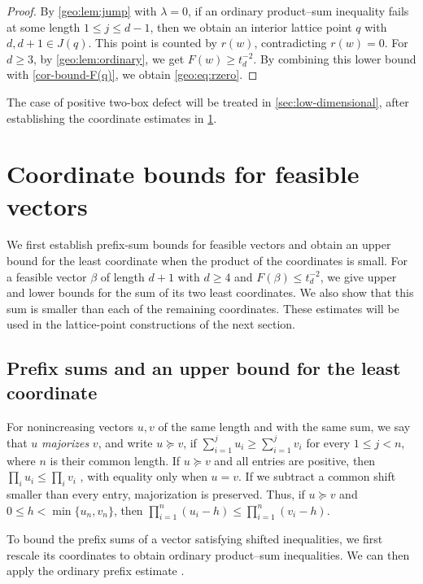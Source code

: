 \documentclass[reqno, 11pt]{article}
\numberwithin{equation}{section}
\theoremstyle{definition}
\begin{document}
\begin{proof}
By \cref{geo:lem:jump} with $\lambda=0$, if an ordinary product--sum inequality fails at some length
$1\le j\le d-1$, then we obtain an interior lattice point $q$ with $d,d+1\in J(q)$.
This point is counted by $r(w)$, contradicting $r(w)=0$.
For $d\ge3$, by \cref{geo:lem:ordinary}, we get $F(w)\ge t_d^{-2}$.
By combining this lower bound with \cref{cor-bound-F(q)}, we obtain \eqref{geo:eq:rzero}.
\end{proof}


The case of positive two-box defect will be treated in \cref{sec:low-dimensional},
after establishing the coordinate estimates in \cref{ra:sec:analysis}.





\section{Coordinate bounds for feasible vectors}
\label{ra:sec:analysis}

We first establish prefix-sum bounds for feasible vectors and obtain an
upper bound for the least coordinate when the product of the coordinates
is small. For a feasible vector \(\beta\) of length \(d+1\) 
with $d\ge4$ and $F(\beta)\le t_d^{-2}$, we give upper and lower bounds for the sum of its two least coordinates. 
We also show that this sum is smaller than each of the remaining coordinates. These estimates
will be used in the lattice-point constructions of the next section.

\subsection{Prefix sums and an upper bound for the least coordinate}

For nonincreasing vectors \(u, v\) of the same length and with the same sum, we say that \(u\) \emph{majorizes} \(v\), and write \(u \succeq v\), if \(\sum_{i=1}^j u_i \ge \sum_{i=1}^j v_i\) for every \(1 \le j < n\), where \(n\) is their common length. If \(u \succeq v\) and all entries are positive, then \(\prod_i u_i \le \prod_i v_i\) \cite[Chapter~3]{MOA2011}, with equality only when \(u = v\).
If we subtract a common shift smaller than every entry, majorization is preserved. 
Thus, if $u\succeq v$ and $0\le h<\min\{u_n,v_n\}$, then $\prod_{i=1}^n(u_i-h) \le\prod_{i=1}^n(v_i-h)$.



To bound the prefix sums of a vector satisfying shifted inequalities,
we first rescale its coordinates to obtain ordinary product--sum
inequalities. We can then apply the ordinary prefix estimate
\cite[Lemma~4.5]{AKN}.
\end{document}
